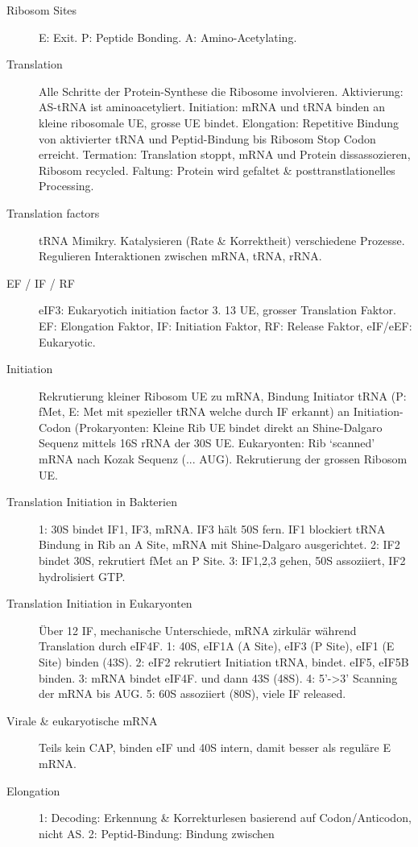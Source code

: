 \documentclass[a4paper,twocolumn,usegeometry,english,fontsize=5,DIV=24]{scrartcl}
\begin{document}
\begin{description}
	\item[Ribosom Sites] E: Exit. P: Peptide Bonding. A: Amino-Acetylating.
	\item[Translation] Alle Schritte der Protein-Synthese die Ribosome
		involvieren. Aktivierung: AS-tRNA ist aminoacetyliert.
		Initiation: mRNA und tRNA binden an kleine ribosomale UE,
		grosse UE bindet. Elongation: Repetitive Bindung von
		aktivierter tRNA und Peptid-Bindung bis Ribosom Stop Codon
		erreicht. Termation: Translation stoppt, mRNA und Protein
		dissassozieren, Ribosom recycled. Faltung: Protein wird
		gefaltet \& posttranstlationelles Processing.
	\item[Translation factors] tRNA Mimikry. Katalysieren (Rate \&
		Korrektheit) verschiedene Prozesse. Regulieren Interaktionen
		zwischen mRNA, tRNA, rRNA.
	\item[EF / IF / RF] eIF3: Eukaryotich initiation factor 3. 13 UE, grosser
		Translation Faktor. EF: Elongation Faktor, IF: Initiation
		Faktor, RF: Release Faktor, eIF/eEF: Eukaryotic.
	\item[Initiation] Rekrutierung kleiner Ribosom UE zu mRNA, Bindung
		Initiator tRNA (P: fMet, E: Met mit spezieller tRNA welche
		durch IF erkannt) an Initiation-Codon (Prokaryonten: Kleine Rib
		UE bindet direkt an Shine-Dalgaro Sequenz mittels 16S rRNA der
		30S UE. Eukaryonten: Rib `scanned' mRNA nach Kozak Sequenz (...
		AUG). Rekrutierung der grossen Ribosom UE.
	\item[Translation Initiation in Bakterien] 1: 30S bindet IF1, IF3,
		mRNA. IF3 hält 50S fern. IF1 blockiert tRNA Bindung in Rib an A
		Site, mRNA mit Shine-Dalgaro ausgerichtet. 2: IF2 bindet 30S,
		rekrutiert fMet an P Site. 3: IF1,2,3 gehen, 50S assoziiert,
		IF2 hydrolisiert GTP.
	\item[Translation Initiation in Eukaryonten] Über 12 IF, mechanische
		Unterschiede, mRNA zirkulär während Translation durch eIF4F. 1:
		40S, eIF1A (A Site), eIF3 (P Site), eIF1 (E Site) binden (43S). 2:
		eIF2 rekrutiert Initiation tRNA, bindet. eIF5, eIF5B binden. 3:
		mRNA bindet eIF4F. und dann 43S (48S). 4: 5'->3' Scanning der
		mRNA bis AUG. 5: 60S assoziiert (80S), viele IF released.
	\item[Virale \& eukaryotische mRNA] Teils kein CAP, binden eIF und 40S
		intern, damit besser als reguläre E mRNA.
	\item[Elongation] 1: Decoding: Erkennung \& Korrekturlesen basierend auf
		Codon/Anticodon, nicht AS. 2: Peptid-Bindung: Bindung zwischen

\end{description}
\end{document}
